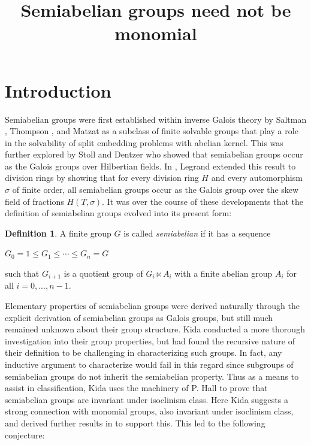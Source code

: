 \documentclass[11pt]{article}
\title{Semiabelian groups need not be monomial}
\theoremstyle{definition}
\newtheorem{defn}[thm]{Definition}
\numberwithin{equation}{section}
\begin{document}
\maketitle

\section{Introduction}
\begin{humanblock}
Semiabelian groups were first established within inverse Galois theory by Saltman \cite{Saltman82}, Thompson \cite{Thompson84}, and Matzat \cite{Matzat87} as a subclass of finite solvable groups that play a role in the solvability of split embedding problems with abelian kernel. This was further explored by Stoll \cite{Stoll95} and Dentzer \cite{Dentzer95} who showed that semiabelian groups occur as the Galois groups over Hilbertian fields. In \cite{Legrand22}, Legrand extended this result to division rings by showing that for every division ring $H$ and every automorphism $\sigma$ of finite order, all semiabelian groups occur as the Galois group over the skew field of fractions $H(T, \sigma)$. It was over the course of these developments that the definition of semiabelian groups evolved into its present form:  

\begin{defn}{\label{maindefn}}
A finite group $G$ is called \textit{semiabelian} if it has a sequence 
\begin{center}
$G_{0} = 1 \le G_{1} \le \cdots \le G_{n} = G$
\end{center}
such that $G_{i+1}$ is a quotient group of $G_{i} \ltimes A_{i}$ with a finite abelian group $A_{i}$ for all $i = 0,...,n-1$.
\end{defn}

Elementary properties of semiabelian groups were derived naturally through the explicit derivation of semiabelian groups as Galois groups, but still much remained unknown about their group structure. Kida \cite{Kida25} conducted a more thorough investigation into their group properties, but had found the recursive nature of their definition to be challenging in characterizing such groups. In fact, any inductive argument to characterize would fail in this regard since subgroups of semiabelian groups do not inherit the semiabelian property. Thus as a means to assist in classification, Kida uses the machinery of P. Hall \cite{Hall40} to prove that semiabelian groups are invariant under isoclinism class. Here Kida suggests a strong connection with monomial groups, also invariant under isoclinism class, and derived further results in \cite{Kida25} to support this. This led to the following conjecture: 


\end{humanblock}
\end{document}
